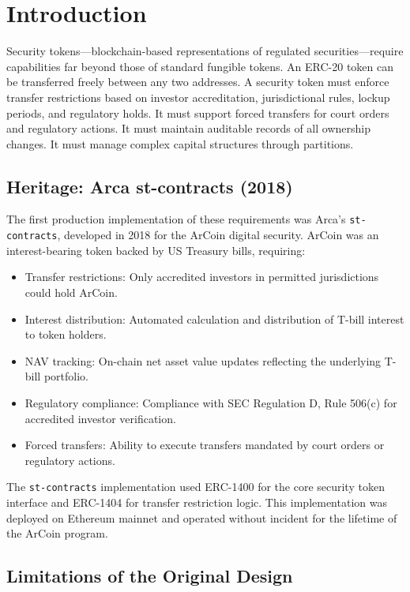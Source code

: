 \section{Introduction}


Security tokens---blockchain-based representations of regulated securities---require capabilities far beyond those of standard fungible tokens. An ERC-20 token can be transferred freely between any two addresses. A security token must enforce transfer restrictions based on investor accreditation, jurisdictional rules, lockup periods, and regulatory holds. It must support forced transfers for court orders and regulatory actions. It must maintain auditable records of all ownership changes. It must manage complex capital structures through partitions.

\subsection{Heritage: Arca st-contracts (2018)}

The first production implementation of these requirements was Arca's \texttt{st-contracts}, developed in 2018 for the ArCoin digital security. ArCoin was an interest-bearing token backed by US Treasury bills, requiring:

\begin{itemize}[nosep]
  \item Transfer restrictions: Only accredited investors in permitted jurisdictions could hold ArCoin.
  \item Interest distribution: Automated calculation and distribution of T-bill interest to token holders.
  \item NAV tracking: On-chain net asset value updates reflecting the underlying T-bill portfolio.
  \item Regulatory compliance: Compliance with SEC Regulation D, Rule 506(c) for accredited investor verification.
  \item Forced transfers: Ability to execute transfers mandated by court orders or regulatory actions.
\end{itemize}

The \texttt{st-contracts} implementation used ERC-1400 for the core security token interface and ERC-1404 for transfer restriction logic. This implementation was deployed on Ethereum mainnet and operated without incident for the lifetime of the ArCoin program.

\subsection{Limitations of the Original Design}

